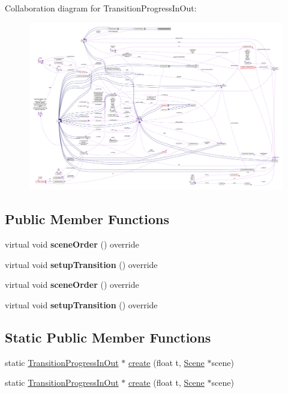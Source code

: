 Collaboration diagram for Transition\+Progress\+In\+Out\+:
\nopagebreak
\begin{figure}[H]
\begin{center}
\leavevmode
\includegraphics[width=350pt]{classTransitionProgressInOut__coll__graph}
\end{center}
\end{figure}
\subsection*{Public Member Functions}
\begin{DoxyCompactItemize}
\item 
\mbox{\label{classTransitionProgressInOut_a548a72c4b7fb889f4e730c62f59613e3}} 
virtual void {\bfseries scene\+Order} () override
\item 
\mbox{\label{classTransitionProgressInOut_ab5f20440c93cb1f6d5569e821bbabcb3}} 
virtual void {\bfseries setup\+Transition} () override
\item 
\mbox{\label{classTransitionProgressInOut_a2a3d25370f8afdc3130040bcd8838c3c}} 
virtual void {\bfseries scene\+Order} () override
\item 
\mbox{\label{classTransitionProgressInOut_aa474186573bc949de5a7e8628ca350bd}} 
virtual void {\bfseries setup\+Transition} () override
\end{DoxyCompactItemize}
\subsection*{Static Public Member Functions}
\begin{DoxyCompactItemize}
\item 
static \hyperlink{classTransitionProgressInOut}{Transition\+Progress\+In\+Out} $\ast$ \hyperlink{classTransitionProgressInOut_a44fb367bb7367c0a53dbcca615cc28bf}{create} (float t, \hyperlink{classScene}{Scene} $\ast$scene)
\item 
static \hyperlink{classTransitionProgressInOut}{Transition\+Progress\+In\+Out} $\ast$ \hyperlink{classTransitionProgressInOut_a509a1c0991a128da4918dc94c92ad77b}{create} (float t, \hyperlink{classScene}{Scene} $\ast$scene)
\end{DoxyCompactItemize}
